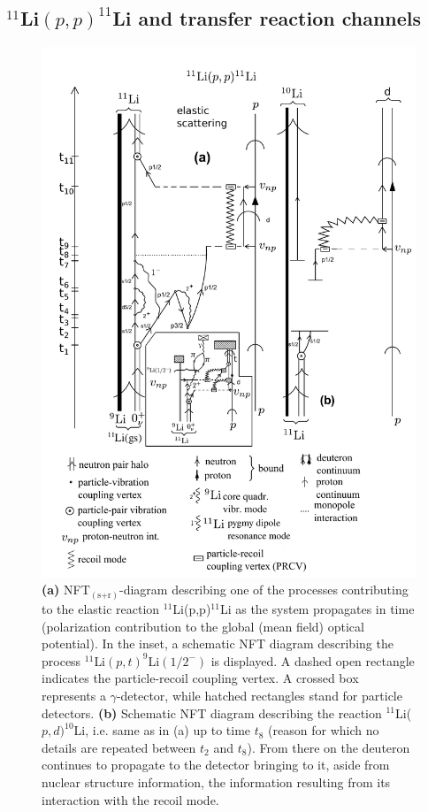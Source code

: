 \subsection{$^{11}$Li$(p,p)^{11}$Li and transfer reaction channels}
     \begin{figure}
     \centerline {
     \includegraphics*[width=12cm]{introduccion/figs/fig1_9_2xx}
     }
     \caption{ {\bf (a)}  NFT$_{(\text{s+r})}$-diagram describing  one of the processes contributing to the elastic reaction $^{11}$Li(p,p)$^{11}$Li as the system propagates in time
         	    	(polarization contribution to the global  (mean field) optical potential). In the inset, a schematic NFT diagram describing the process $^{11}$Li$(p,t)^{9}$Li$(1/2^-)$ is displayed. A dashed open rectangle indicates the particle-recoil coupling vertex. A crossed box represents a $\gamma$-detector, while hatched rectangles stand for particle detectors. 
         	    	 {\bf (b)} Schematic NFT diagram describing the reaction $^{11}$Li($p,d)^{10}$Li, i.e. same as in (a)  up to time $t_8$ (reason for which no  details are repeated between $t_2$ and $t_8$). From there on  the deuteron continues  to propagate  to the detector bringing to it, aside from nuclear structure information, the information resulting from its interaction with the recoil mode. }
     \label{fig1.9.2}
     \end{figure}
